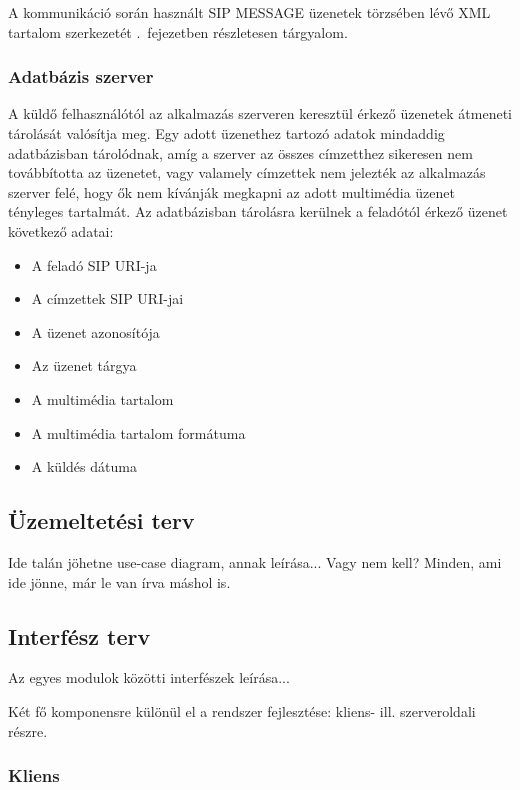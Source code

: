 A kommunikáció során használt SIP MESSAGE üzenetek törzsében lévő XML tartalom szerkezetét .~fejezetben részletesen tárgyalom.

\subsubsection{Adatbázis szerver}
\label{sec:dbserver}

A küldő felhasználótól az alkalmazás szerveren keresztül érkező üzenetek átmeneti tárolását valósítja meg. Egy adott üzenethez tartozó adatok mindaddig adatbázisban tárolódnak, amíg a szerver az összes címzetthez sikeresen nem továbbította az üzenetet, vagy valamely címzettek nem jelezték az alkalmazás szerver felé, hogy ők nem kívánják megkapni az adott multimédia üzenet tényleges tartalmát. Az adatbázisban tárolásra kerülnek a feladótól érkező üzenet következő adatai:

\begin{itemize}\itemsep1pt
\item	A feladó SIP URI-ja
\item A címzettek SIP URI-jai
\item A üzenet azonosítója
\item Az üzenet tárgya
\item A multimédia tartalom
\item A multimédia tartalom formátuma
\item A küldés dátuma
\end{itemize}

\subsection{Üzemeltetési terv}
\label{sec:uzemeltetesi_terv}

Ide talán jöhetne use-case diagram, annak leírása... Vagy nem kell? Minden, ami ide jönne, már le van írva máshol is. 

\subsection{Interfész terv}
\label{sec:interfesz_terv}

Az egyes modulok közötti interfészek leírása...

Két fő komponensre különül el a rendszer fejlesztése: kliens-
ill. szerveroldali részre.

\subsubsection{Kliens}
\label{sec:kliensinterfesz}

